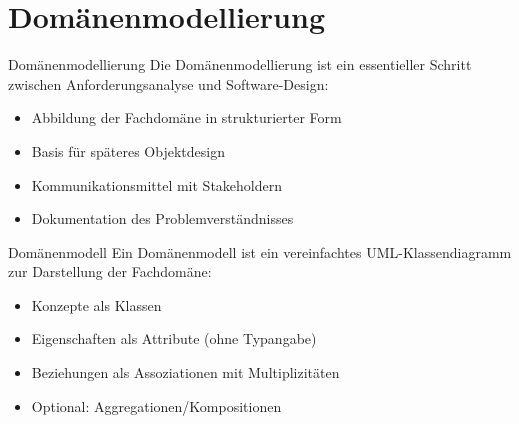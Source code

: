 \section{Domänenmodellierung}

\begin{definition}{Domänenmodellierung}
Die Domänenmodellierung ist ein essentieller Schritt zwischen Anforderungsanalyse und Software-Design:
\begin{itemize}
    \item Abbildung der Fachdomäne in strukturierter Form
    \item Basis für späteres Objektdesign
    \item Kommunikationsmittel mit Stakeholdern
    \item Dokumentation des Problemverständnisses
\end{itemize}
\end{definition}

\begin{concept}{Domänenmodell}
Ein Domänenmodell ist ein vereinfachtes UML-Klassendiagramm zur Darstellung der Fachdomäne:
\begin{itemize}
    \item Konzepte als Klassen
    \item Eigenschaften als Attribute (ohne Typangabe)
    \item Beziehungen als Assoziationen mit Multiplizitäten
    \item Optional: Aggregationen/Kompositionen
\end{itemize}
\end{concept}

